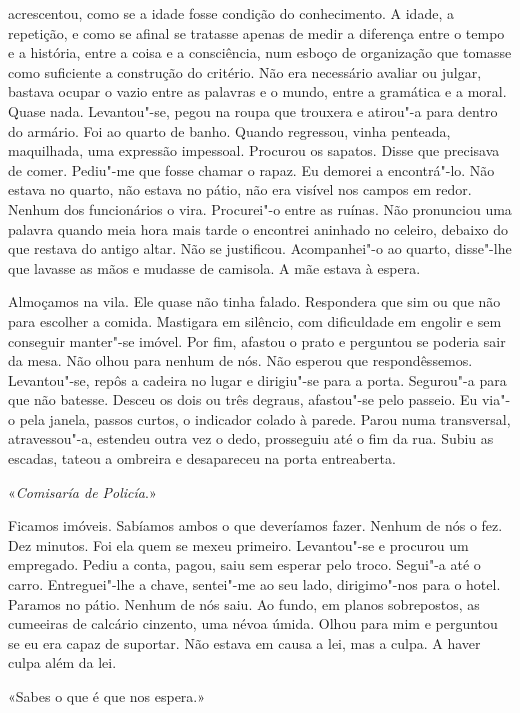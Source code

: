 acrescentou, como se a idade fosse condição do conhecimento. A idade, a
repetição, e como se afinal se tratasse apenas de medir a diferença
entre o tempo e a história, entre a coisa e a consciência, num esboço de
organização que tomasse como suficiente a construção do critério. Não
era necessário avaliar ou julgar, bastava ocupar o vazio entre as
palavras e o mundo, entre a gramática e a moral. Quase nada.
Levantou"-se, pegou na roupa que trouxera e atirou"-a para dentro do
armário. Foi ao quarto de banho. Quando regressou, vinha penteada,
maquilhada, uma expressão impessoal. Procurou os sapatos. Disse que
precisava de comer. Pediu"-me que fosse chamar o rapaz. Eu demorei a
encontrá"-lo. Não estava no quarto, não estava no pátio, não era visível
nos campos em redor. Nenhum dos funcionários o vira. Procurei"-o entre
as ruínas. Não pronunciou uma palavra quando meia hora mais tarde o
encontrei aninhado no celeiro, debaixo do que restava do antigo altar.
Não se justificou. Acompanhei"-o ao quarto, disse"-lhe que lavasse as
mãos e mudasse de camisola. A mãe estava à espera.

Almoçamos na vila. Ele quase não tinha falado. Respondera que sim ou que
não para escolher a comida. Mastigara em silêncio, com dificuldade em
engolir e sem conseguir manter"-se imóvel. Por fim, afastou o prato e
perguntou se poderia sair da mesa. Não olhou para nenhum de nós. Não
esperou que respondêssemos. Levantou"-se, repôs a cadeira no lugar e
dirigiu"-se para a porta. Segurou"-a para que não batesse. Desceu os
dois ou três degraus, afastou"-se pelo passeio. Eu via"-o pela janela,
passos curtos, o indicador colado à parede. Parou numa transversal,
atravessou"-a, estendeu outra vez o dedo, prosseguiu até o fim da rua.
Subiu as escadas, tateou a ombreira e desapareceu na porta entreaberta.

«\emph{Comisaría de Policía}.»

Ficamos imóveis. Sabíamos ambos o que deveríamos fazer. Nenhum de nós o
fez. Dez minutos. Foi ela quem se mexeu primeiro. Levantou"-se e
procurou um empregado. Pediu a conta, pagou, saiu sem esperar pelo
troco. Segui"-a até o carro. Entreguei"-lhe a chave, sentei"-me ao seu
lado, dirigimo"-nos para o hotel. Paramos no pátio. Nenhum de nós saiu.
Ao fundo, em planos sobrepostos, as cumeeiras de calcário cinzento, uma
névoa úmida. Olhou para mim e perguntou se eu era capaz de suportar.
Não estava em causa a lei, mas a culpa. A haver culpa além da lei.

«Sabes o que é que nos espera.»

